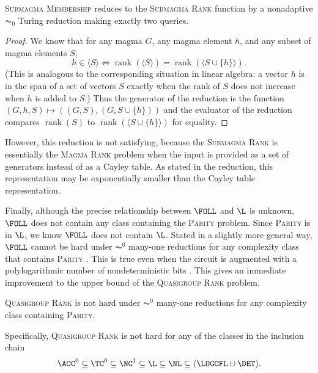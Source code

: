 \documentclass{article}
\newcommand{\gen}[1]{\langle #1 \rangle}
\DeclareMathOperator{\rank}{rank}
\begin{document}
\begin{proposition}
  \textsc{Submagma Membership} reduces to the \textsc{Submagma Rank} function by a nonadaptive $\AC_0$ Turing reduction making exactly two queries.
\end{proposition}
\begin{proof}
  We know that for any magma $G$, any magma element $h$, and any subset of magma elements $S$,
  \begin{equation*}
    h \in \gen{S} \iff \rank(\gen{S}) = \rank(\gen{S \cup \{h\}}).
  \end{equation*}
  (This is analogous to the corresponding situation in linear algebra: a vector $h$ is in the span of a set of vectors $S$ exactly when the rank of $S$ does not increase when $h$ is added to $S$.)
  Thus the generator of the reduction is the function $(G, h, S) \mapsto ((G, S), (G, S \cup \{h\}))$ and the evaluator of the reduction compares $\rank({S})$ to $\rank(\gen{S \cup \{h\}})$ for equality.
\end{proof}

However, this reduction is not satisfying, because the \textsc{Submagma Rank} is essentially the \textsc{Magma Rank} problem when the input is provided as a set of generators instead of as a Cayley table.
As stated in the reduction, this representation may be exponentially smaller than the Cayley table representation.

Finally, although the precise relationship between $\FOLL$ and $\L$ is unknown, $\FOLL$ does not contain any class containing the \textsc{Parity} problem.
Since \textsc{Parity} is in $\L$, we know $\FOLL$ does not contain $\L$.
Stated in a slightly more general way, $\FOLL$ cannot be hard under $\AC^0$ many-one reductions for any complexity class that contains \textsc{Parity} \cite[Proposition~2.1]{bklm01}.
This is true even when the circuit is augmented with a polylogarithmic number of nondeterministic bits \cite[Section~4]{ctw13}.
This gives an immediate improvement to the upper bound of the \textsc{Quasigroup Rank} problem.

\begin{theorem}
  \textsc{Quasigroup Rank} is not hard under $\AC^0$ many-one reductions for any complexity class containing \textsc{Parity}.
\end{theorem}

Specifically, \textsc{Quasigroup Rank} is not hard for any of the classes in the inclusion chain
\begin{equation*}
  \ACC^0 \subseteq \TC^0 \subseteq \NC^1 \subseteq \L \subseteq \NL \subseteq (\LOGCFL \cup \DET).
\end{equation*}

\printbibliography
\end{document}
